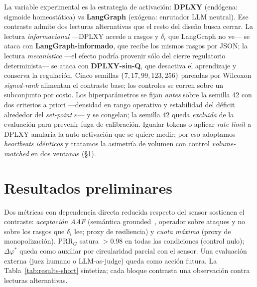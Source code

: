 \documentclass{llncs}
\begin{document}
La variable experimental es la estrategia de activaci\'on:
\textbf{DPLXY} (end\'ogena: sigmoide homeost\'atica) vs
\textbf{LangGraph} (ex\'ogena: enrutador LLM neutral). Ese contraste
admite dos lecturas alternativas que el resto del dise\~no busca
cerrar. La lectura \emph{informacional} ---DPLXY accede a rasgos
y $\delta_i$ que LangGraph no ve--- se ataca con
\textbf{LangGraph-informado}, que recibe los mismos rasgos por
JSON; la lectura \emph{mecan\'istica} ---el efecto podr\'ia
provenir s\'olo del cierre regulatorio determinista--- se ataca
con \textbf{DPLXY-sin-Q}, que desactiva el aprendizaje y conserva
la regulaci\'on. Cinco semillas $\{7,17,99,123,256\}$ pareadas
por Wilcoxon \emph{signed-rank} alimentan el contraste base; los
controles se corren sobre un subconjunto por costo. Los
hiperpar\'ametros se fijan \emph{antes} sobre la semilla 42 con
dos criterios a priori ---densidad en rango operativo y
estabilidad del d\'eficit alrededor del \emph{set-point}
$\varepsilon$--- y se congelan; la semilla 42 queda \emph{excluida}
de la evaluaci\'on para prevenir fuga de calibraci\'on. Igualar
tokens o aplicar \emph{rate limit} a DPLXY anular\'ia la
auto-activaci\'on que se quiere medir; por eso adoptamos
\emph{heartbeats id\'enticos} y tratamos la asimetr\'ia de volumen
con control \emph{volume-matched} en dos ventanas
(\S\ref{sec:resultados}).

\section{Resultados preliminares}
\label{sec:resultados}

Dos m\'etricas con dependencia directa reducida respecto del sensor
sostienen el contraste: \emph{aceptaci\'on AAF} (sem\'antica
grounded~\parencite{dung1995acceptability}, operador sobre ataques
y no sobre los rasgos que $\delta_i$ lee; proxy de resiliencia)
y \emph{cuota m\'axima} (proxy de monopolizaci\'on).
$\mathrm{PRR}_G$ satura $>\!0.98$ en todas las condiciones (control
nulo); $\Delta\varphi^*$ queda como auxiliar por circularidad
parcial con el sensor. Una evaluaci\'on externa (juez humano o
LLM-as-judge) queda como acci\'on futura. La
Tabla~\ref{tab:results-short} sintetiza; cada bloque contrasta una
observaci\'on contra lecturas alternativas.
\end{document}
